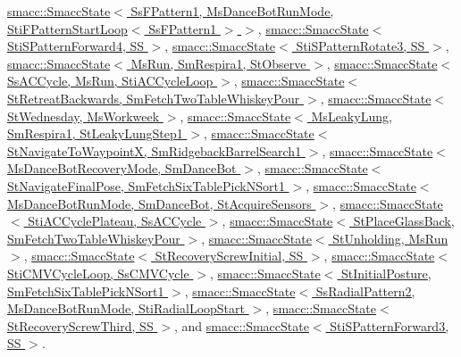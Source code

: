 \hyperlink{classsmacc_1_1SmaccState_afc39f8e0ca4001b2159a100da2fccd0e}{smacc\+::\+Smacc\+State$<$ Ss\+F\+Pattern1, Ms\+Dance\+Bot\+Run\+Mode, Sti\+F\+Pattern\+Start\+Loop$<$ Ss\+F\+Pattern1 $>$ $>$}, \hyperlink{classsmacc_1_1SmaccState_afc39f8e0ca4001b2159a100da2fccd0e}{smacc\+::\+Smacc\+State$<$ Sti\+S\+Pattern\+Forward4, S\+S $>$}, \hyperlink{classsmacc_1_1SmaccState_afc39f8e0ca4001b2159a100da2fccd0e}{smacc\+::\+Smacc\+State$<$ Sti\+S\+Pattern\+Rotate3, S\+S $>$}, \hyperlink{classsmacc_1_1SmaccState_afc39f8e0ca4001b2159a100da2fccd0e}{smacc\+::\+Smacc\+State$<$ Ms\+Run, Sm\+Respira1, St\+Observe $>$}, \hyperlink{classsmacc_1_1SmaccState_afc39f8e0ca4001b2159a100da2fccd0e}{smacc\+::\+Smacc\+State$<$ Ss\+A\+C\+Cycle, Ms\+Run, Sti\+A\+C\+Cycle\+Loop $>$}, \hyperlink{classsmacc_1_1SmaccState_afc39f8e0ca4001b2159a100da2fccd0e}{smacc\+::\+Smacc\+State$<$ St\+Retreat\+Backwards, Sm\+Fetch\+Two\+Table\+Whiskey\+Pour $>$}, \hyperlink{classsmacc_1_1SmaccState_afc39f8e0ca4001b2159a100da2fccd0e}{smacc\+::\+Smacc\+State$<$ St\+Wednesday, Ms\+Workweek $>$}, \hyperlink{classsmacc_1_1SmaccState_afc39f8e0ca4001b2159a100da2fccd0e}{smacc\+::\+Smacc\+State$<$ Ms\+Leaky\+Lung, Sm\+Respira1, St\+Leaky\+Lung\+Step1 $>$}, \hyperlink{classsmacc_1_1SmaccState_afc39f8e0ca4001b2159a100da2fccd0e}{smacc\+::\+Smacc\+State$<$ St\+Navigate\+To\+Waypoint\+X, Sm\+Ridgeback\+Barrel\+Search1 $>$}, \hyperlink{classsmacc_1_1SmaccState_afc39f8e0ca4001b2159a100da2fccd0e}{smacc\+::\+Smacc\+State$<$ Ms\+Dance\+Bot\+Recovery\+Mode, Sm\+Dance\+Bot $>$}, \hyperlink{classsmacc_1_1SmaccState_afc39f8e0ca4001b2159a100da2fccd0e}{smacc\+::\+Smacc\+State$<$ St\+Navigate\+Final\+Pose, Sm\+Fetch\+Six\+Table\+Pick\+N\+Sort1 $>$}, \hyperlink{classsmacc_1_1SmaccState_afc39f8e0ca4001b2159a100da2fccd0e}{smacc\+::\+Smacc\+State$<$ Ms\+Dance\+Bot\+Run\+Mode, Sm\+Dance\+Bot, St\+Acquire\+Sensors $>$}, \hyperlink{classsmacc_1_1SmaccState_afc39f8e0ca4001b2159a100da2fccd0e}{smacc\+::\+Smacc\+State$<$ Sti\+A\+C\+Cycle\+Plateau, Ss\+A\+C\+Cycle $>$}, \hyperlink{classsmacc_1_1SmaccState_afc39f8e0ca4001b2159a100da2fccd0e}{smacc\+::\+Smacc\+State$<$ St\+Place\+Glass\+Back, Sm\+Fetch\+Two\+Table\+Whiskey\+Pour $>$}, \hyperlink{classsmacc_1_1SmaccState_afc39f8e0ca4001b2159a100da2fccd0e}{smacc\+::\+Smacc\+State$<$ St\+Unholding, Ms\+Run $>$}, \hyperlink{classsmacc_1_1SmaccState_afc39f8e0ca4001b2159a100da2fccd0e}{smacc\+::\+Smacc\+State$<$ St\+Recovery\+Screw\+Initial, S\+S $>$}, \hyperlink{classsmacc_1_1SmaccState_afc39f8e0ca4001b2159a100da2fccd0e}{smacc\+::\+Smacc\+State$<$ Sti\+C\+M\+V\+Cycle\+Loop, Ss\+C\+M\+V\+Cycle $>$}, \hyperlink{classsmacc_1_1SmaccState_afc39f8e0ca4001b2159a100da2fccd0e}{smacc\+::\+Smacc\+State$<$ St\+Initial\+Posture, Sm\+Fetch\+Six\+Table\+Pick\+N\+Sort1 $>$}, \hyperlink{classsmacc_1_1SmaccState_afc39f8e0ca4001b2159a100da2fccd0e}{smacc\+::\+Smacc\+State$<$ Ss\+Radial\+Pattern2, Ms\+Dance\+Bot\+Run\+Mode, Sti\+Radial\+Loop\+Start $>$}, \hyperlink{classsmacc_1_1SmaccState_afc39f8e0ca4001b2159a100da2fccd0e}{smacc\+::\+Smacc\+State$<$ St\+Recovery\+Screw\+Third, S\+S $>$}, and \hyperlink{classsmacc_1_1SmaccState_afc39f8e0ca4001b2159a100da2fccd0e}{smacc\+::\+Smacc\+State$<$ Sti\+S\+Pattern\+Forward3, S\+S $>$}.



